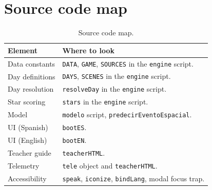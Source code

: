 \documentclass[11pt,a4paper]{article}
\newcommand{\code}[1]{\texttt{#1}}
\begin{document}
\section{Source code map}

\begin{table}[H]
\centering
\small
\begin{tabular}{@{}p{4.2cm}p{10.2cm}@{}}
\toprule
\textbf{Element} & \textbf{Where to look}\\
\midrule
Data constants & \code{DATA}, \code{GAME}, \code{SOURCES} in the \code{engine} script.\\
Day definitions & \code{DAYS}, \code{SCENES} in the \code{engine} script.\\
Day resolution & \code{resolveDay} in the \code{engine} script.\\
Star scoring & \code{stars} in the \code{engine} script.\\
Model & \code{modelo} script, \code{predecirEventoEspacial}.\\
UI (Spanish) & \code{bootES}.\\
UI (English) & \code{bootEN}.\\
Teacher guide & \code{teacherHTML}.\\
Telemetry & \code{tele} object and \code{teacherHTML}.\\
Accessibility & \code{speak}, \code{iconize}, \code{bindLang}, modal focus trap.\\
\bottomrule
\end{tabular}
\caption{Source code map.}
\label{tab:sourcemap}
\end{table}
\end{document}
